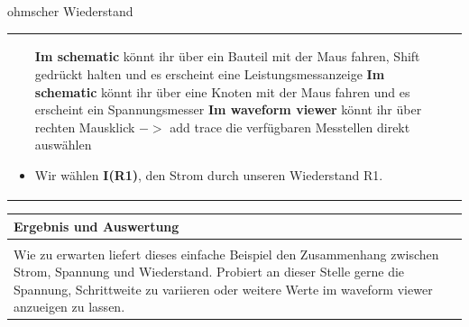 \begin{frame}[t]{ohmscher Wiederstand}
\begin{spacing}{0.9}
\begin{tiny}
\begin{table}[h!]
\begin{tabular}{p{5cm} p{5cm}}
\begin{minipage}{.5\textwidth}
\begin{itemize}
            \textbf{Im schematic} könnt ihr über ein Bauteil mit der Maus fahren, Shift gedrückt halten und es erscheint eine Leistungsmessanzeige\newline\newline
            \textbf{Im schematic} könnt ihr über eine Knoten mit der Maus fahren und es erscheint ein Spannungsmesser\newline\newline
            \textbf{Im waveform viewer} könnt ihr über rechten Mausklick $->$ add trace die verfügbaren Messtellen direkt auswählen
            \item Wir wählen \textbf{I(R1)}, den Strom durch unseren Wiederstand R1. 
          \end{itemize}
          \end{minipage} 
          \\
        \end{tabular}
      \end{table}
    \end{tiny} \end{spacing}
    
      \begin{spacing}{0.9} \begin{tiny}
        \begin{table}[h!]
          \begin{tabular}{p{10cm} }
            \hline
            \textbf{Ergebnis und Auswertung} \\
            \hline \\    
            Wie zu erwarten liefert dieses einfache Beispiel den Zusammenhang zwischen Strom, Spannung und Wiederstand. Probiert an dieser Stelle gerne die Spannung, Schrittweite
            zu variieren oder weitere Werte im waveform viewer anzueigen zu lassen.
          \end{tabular}
        \end{table}
      \end{tiny} \end{spacing}
      
       \end{frame}